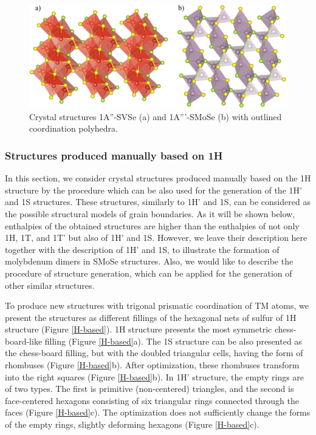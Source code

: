 \documentclass[a4paperm]{article}
\begin{document}
\begin{figure}[H]
	\includegraphics[width=\textwidth]{airss3_poly.png}
	\caption{Crystal structures 1A''-SVSe (a) and 1A'''-SMoSe (b) with outlined coordination polyhedra.}
	\label{airss3_poly}
\end{figure}




\subsubsection{Structures produced manually based on 1H}

In this section, we consider crystal structures produced manually based on the 1H structure by the procedure which can be also used for the generation of the 1H' and 1S structures.
These structures, similarly to 1H' and 1S, can be considered as the possible structural models of grain boundaries.
As it will be shown below, enthalpies of the obtained structures are higher than the enthalpies of not only 1H, 1T, and 1T' but also of 1H' and 1S.
However, we leave their description here together with the description of 1H' and 1S, to illustrate the formation of molybdenum dimers in SMoSe structures.
Also, we would like to describe the procedure of structure generation, which can be applied for the generation of other similar structures.

To produce new structures with trigonal prismatic coordination of TM atoms, we present the structures as different fillings of the hexagonal nets of sulfur of 1H structure (Figure \ref{H-based}).
1H structure presents the most symmetric chess-board-like filling (Figure \ref{H-based}a).
The 1S structure can be also presented as the chess-board filling, but with the doubled triangular cells, having the form of rhombuses (Figure \ref{H-based}b).
After optimization, these rhombuses transform into the right squares (Figure \ref{H-based}b).
In 1H' structure, the empty rings are of two types.
The first is primitive (non-centered) triangles, and the second is face-centered hexagons consisting of six triangular rings connected through the faces (Figure \ref{H-based}c).
The optimization does not sufficiently change the forms of the empty rings, slightly deforming hexagons (Figure \ref{H-based}c).
\end{document}
